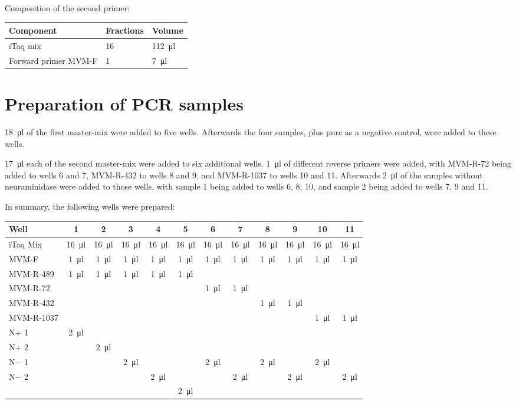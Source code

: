 \documentclass[a4paper,english]{scrreprt}
\begin{document}
Composition of the second primer:
\\

\begin{tabu}{lll}
	\toprule
	Component & Fractions & Volume \\
	\midrule
	iTaq mix & 16 & \SI{112}{\ul} \\
	Forward primer MVM-F & 1 & \SI{7}{\ul} \\
	\bottomrule
\end{tabu}

\section{Preparation of PCR samples}

\SI{18}{\ul} of the first master-mix were added to five wells. Afterwards the
four samples, plus pure  as a negative control, were added to these
wells.

\SI{17}{\ul} each of the second master-mix were added to six additional wells.
\SI{1}{\ul} of different reverse primers were added, with MVM-R-72 being added
to wells 6 and 7, MVM-R-432 to wells 8 and 9, and MVM-R-1037 to wells 10 and
11. Afterwards \SI{2}{\ul} of the samples without neuraminidase were added to
those wells, with sample 1 being added to wells 6, 8, 10, and sample 2 being
added to wells 7, 9 and 11.

In summary, the following wells were prepared:
\\

\begin{tabu}{lccccccccccc}
	\toprule
	Well & 1 & 2 & 3 & 4 & 5 & 6 & 7 & 8 & 9 & 10 & 11 \\
	\midrule 
	iTaq Mix & \SI{16}{\ul} & \SI{16}{\ul} & \SI{16}{\ul} & \SI{16}{\ul} & \SI{16}{\ul} & \SI{16}{\ul} & \SI{16}{\ul} & \SI{16}{\ul} & \SI{16}{\ul} & \SI{16}{\ul} & \SI{16}{\ul} \\
	MVM-F & \SI{1}{\ul} & \SI{1}{\ul} & \SI{1}{\ul} & \SI{1}{\ul} & \SI{1}{\ul} & \SI{1}{\ul} & \SI{1}{\ul} & \SI{1}{\ul} & \SI{1}{\ul} & \SI{1}{\ul} & \SI{1}{\ul} \\
	MVM-R-489 & \SI{1}{\ul} & \SI{1}{\ul} & \SI{1}{\ul} & \SI{1}{\ul} & \SI{1}{\ul} &  &  &  &  &  &  \\
	MVM-R-72 & & & & & & \SI{1}{\ul} & \SI{1}{\ul} & & & & \\
	MVM-R-432 & & & & & & & & \SI{1}{\ul} & \SI{1}{\ul} & & \\
	MVM-R-1037 & & & & & & & & & & \SI{1}{\ul} & \SI{1}{\ul} \\
	N$+$ 1 & \SI{2}{\ul} & & & & & & & & & & \\
	N$+$ 2 & & \SI{2}{\ul} & & & & & & & & & \\
	N$-$ 1 & & & \SI{2}{\ul} & & & \SI{2}{\ul} & & \SI{2}{\ul} & & \SI{2}{\ul} & \\
	N$-$ 2 & & & & \SI{2}{\ul} & & & \SI{2}{\ul} & & \SI{2}{\ul} & & \SI{2}{\ul} \\
	 & & & & & \SI{2}{\ul} & & & & & & \\
	\bottomrule
\end{tabu}
\\
\end{document}
